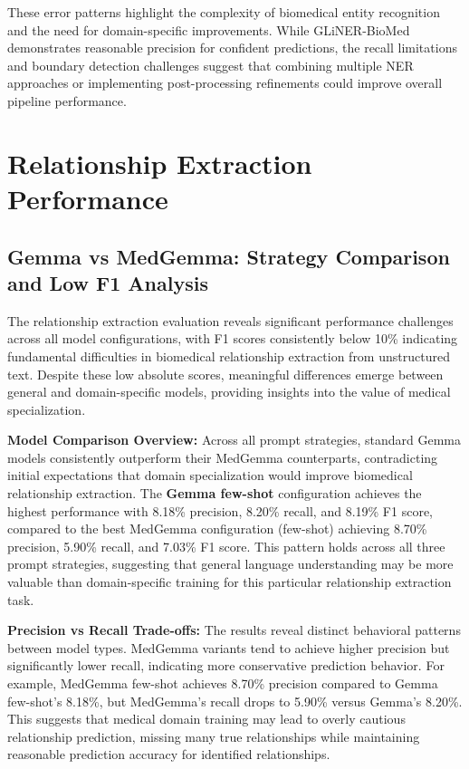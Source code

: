 These error patterns highlight the complexity of biomedical entity recognition and the need for domain-specific improvements. While GLiNER-BioMed demonstrates reasonable precision for confident predictions, the recall limitations and boundary detection challenges suggest that combining multiple NER approaches or implementing post-processing refinements could improve overall pipeline performance.


\section{Relationship Extraction Performance}

\subsection{Gemma vs MedGemma: Strategy Comparison and Low F1 Analysis}

The relationship extraction evaluation reveals significant performance challenges across all model configurations, with F1 scores consistently below 10\% indicating fundamental difficulties in biomedical relationship extraction from unstructured text. Despite these low absolute scores, meaningful differences emerge between general and domain-specific models, providing insights into the value of medical specialization.

\textbf{Model Comparison Overview:} Across all prompt strategies, standard Gemma models consistently outperform their MedGemma counterparts, contradicting initial expectations that domain specialization would improve biomedical relationship extraction. The \textbf{Gemma few-shot} configuration achieves the highest performance with 8.18\% precision, 8.20\% recall, and 8.19\% F1 score, compared to the best MedGemma configuration (few-shot) achieving 8.70\% precision, 5.90\% recall, and 7.03\% F1 score. This pattern holds across all three prompt strategies, suggesting that general language understanding may be more valuable than domain-specific training for this particular relationship extraction task.

\textbf{Precision vs Recall Trade-offs:} The results reveal distinct behavioral patterns between model types. MedGemma variants tend to achieve higher precision but significantly lower recall, indicating more conservative prediction behavior. For example, MedGemma few-shot achieves 8.70\% precision compared to Gemma few-shot's 8.18\%, but MedGemma's recall drops to 5.90\% versus Gemma's 8.20\%. This suggests that medical domain training may lead to overly cautious relationship prediction, missing many true relationships while maintaining reasonable prediction accuracy for identified relationships.

